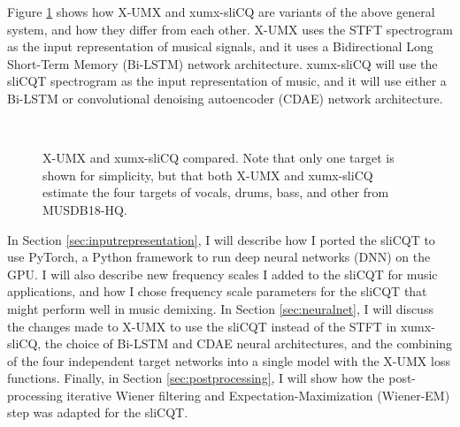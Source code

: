 \documentclass[report.tex]{subfiles}
\begin{document}
Figure \ref{fig:umxandxumxslicq} shows how X-UMX and xumx-sliCQ are variants of the above general system, and how they differ from each other. X-UMX uses the STFT spectrogram as the input representation of musical signals, and it uses a Bidirectional Long Short-Term Memory (Bi-LSTM) network architecture. xumx-sliCQ will use the sliCQT spectrogram as the input representation of music, and it will use either a Bi-LSTM or convolutional denoising autoencoder (CDAE) network architecture.

\begin{figure}[ht]
	\centering
	\\
	\caption{X-UMX and xumx-sliCQ compared. Note that only one target is shown for simplicity, but that both X-UMX and xumx-sliCQ estimate the four targets of vocals, drums, bass, and other from MUSDB18-HQ.}
	\label{fig:umxandxumxslicq}
\end{figure}

In Section \ref{sec:inputrepresentation}, I will describe how I ported the sliCQT to use PyTorch, a Python framework to run deep neural networks (DNN) on the GPU. I will also describe new frequency scales I added to the sliCQT for music applications, and how I chose frequency scale parameters for the sliCQT that might perform well in music demixing. In Section \ref{sec:neuralnet}, I will discuss the changes made to X-UMX to use the sliCQT instead of the STFT in xumx-sliCQ, the choice of Bi-LSTM and CDAE neural architectures, and the combining of the four independent target networks into a single model with the X-UMX loss functions. Finally, in Section \ref{sec:postprocessing}, I will show how the post-processing iterative Wiener filtering and Expectation-Maximization (Wiener-EM) step was adapted for the sliCQT.
\end{document}
